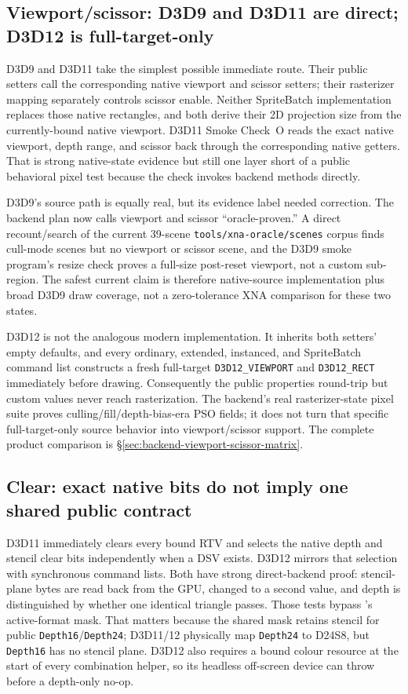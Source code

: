 \subsection{Viewport/scissor: D3D9 and D3D11 are direct; D3D12 is full-target-only}

D3D9 and D3D11 take the simplest possible immediate route. Their public setters call the
corresponding native viewport and scissor setters; their rasterizer mapping separately controls
scissor enable. Neither SpriteBatch implementation replaces those native rectangles, and both
derive their 2D projection size from the currently-bound native viewport. D3D11 Smoke Check~O
reads the exact native viewport, depth range, and scissor back through the corresponding native
getters. That is strong native-state evidence but still one layer short of a public behavioral
pixel test because the check invokes backend methods directly.

D3D9's source path is equally real, but its evidence label needed correction. The backend plan
now calls viewport and scissor ``oracle-proven.'' A direct recount/search of the current
39-scene \texttt{tools/xna-oracle/scenes} corpus finds cull-mode scenes but no viewport or
scissor scene, and the D3D9 smoke program's resize check proves a full-size post-reset viewport,
not a custom sub-region. The safest current claim is therefore native-source implementation
plus broad D3D9 draw coverage, not a zero-tolerance XNA comparison for these two states.

D3D12 is not the analogous modern implementation. It inherits both setters' empty defaults,
and every ordinary, extended, instanced, and SpriteBatch command list constructs a fresh
full-target \texttt{D3D12\_VIEWPORT} and \texttt{D3D12\_RECT} immediately before drawing.
Consequently the public properties round-trip but custom values never reach rasterization.
The backend's real rasterizer-state pixel suite proves culling/fill/depth-bias-era PSO fields;
it does not turn that specific full-target-only source behavior into viewport/scissor support.
The complete product comparison is \S\ref{sec:backend-viewport-scissor-matrix}.

\subsection{Clear: exact native bits do not imply one shared public contract}

D3D11 immediately clears every bound RTV and selects the native depth and stencil clear bits
independently when a DSV exists. D3D12 mirrors that selection with synchronous command lists.
Both have strong
direct-backend proof: stencil-plane bytes are read back from the GPU, changed to a second
value, and depth is distinguished by whether one identical triangle passes. Those tests bypass
's active-format mask. That matters because the shared mask retains
stencil for public \texttt{Depth16}/\texttt{Depth24}; D3D11/12 physically map
\texttt{Depth24} to D24S8, but \texttt{Depth16} has no stencil plane. D3D12 also requires a
bound colour resource at the start of every combination helper, so its headless off-screen
device can throw before a depth-only no-op.

